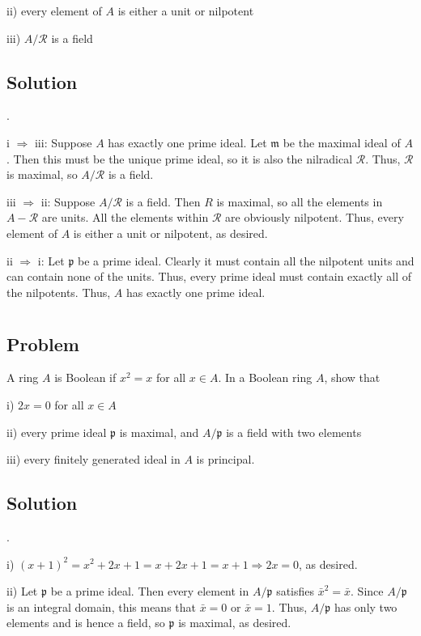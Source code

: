 \documentclass[book,12pt,oneside,openany]{memoir}
\begin{document}
ii) every element of $A$ is either a unit or nilpotent

iii) $A/\mathcal{R}$ is a field
\subsection{Solution}
.

i $\Rightarrow$ iii: Suppose $A$ has exactly one prime ideal. Let $\mathfrak{m}$ be the maximal ideal of $A$. Then this must be the unique prime ideal, so it is also the nilradical $\mathcal{R}$. Thus, $\mathcal{R}$ is maximal, so $A/\mathcal{R}$ is a field.

iii $\Rightarrow$ ii: Suppose $A/\mathcal{R}$ is a field. Then $R$ is maximal, so all the elements in $A - \mathcal{R}$ are units. All the elements within $\mathcal{R}$ are obviously nilpotent. Thus, every element of $A$ is either a unit or nilpotent, as desired.

ii $\Rightarrow$ i: Let $\mathfrak{p}$ be a prime ideal. Clearly it must contain all the nilpotent units and can contain none of the units. Thus, every prime ideal must contain exactly all of the nilpotents. Thus, $A$ has exactly one prime ideal.



\section{}
\subsection{Problem}
A ring $A$ is Boolean if $x^2 = x$ for all $x \in A$. In a Boolean ring $A$, show that 

i) $2x = 0$ for all $x \in A$

ii) every prime ideal $\mathfrak{p}$ is maximal, and $A/\mathfrak{p}$ is a field with two elements

iii) every finitely generated ideal in $A$ is principal.
\subsection{Solution}

.

i) $(x +1)^2 = x^2 + 2x + 1 = x + 2x + 1 = x + 1 \Rightarrow 2x = 0$, as desired.

ii) Let $\mathfrak{p}$ be a prime ideal. Then every element in $A/\mathfrak{p}$ satisfies $\bar{x}^2 = \bar{x}$. Since $A/\mathfrak{p}$ is an integral domain, this means that $\bar{x} = 0$ or $\bar{x} = 1$. Thus, $A/\mathfrak{p}$ has only two elements and is hence a field, so $\mathfrak{p}$ is maximal, as desired.
\end{document}
